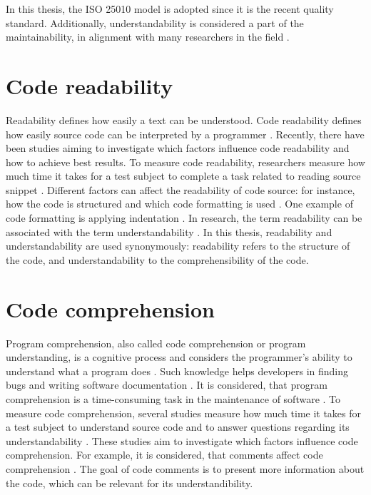 In this thesis, the ISO 25010 model is adopted since it is the recent quality standard. Additionally, understandability is considered a part of the maintainability, in alignment with many researchers in the field \cite{xia2017measuring}. 



\section{Code readability}

Readability defines how easily a text can be understood. Code readability defines how easily source code can be interpreted by a programmer \cite{bakhuizen2019comments}.  Recently, there have been studies aiming to investigate which factors influence code readability and how to achieve best results. 
To measure code readability, researchers measure how much time it takes for a test subject to complete a task related to reading source snippet  \cite{bakhuizen2019comments}.   Different factors can affect the readability of code source: for instance, how the code is structured and which code formatting is used  \cite{bakhuizen2019comments}.  One example of code formatting is applying indentation \cite{buse2009learning}. In research, the term readability can be associated with the term understandability \cite{winkler2024investigating}. In this thesis, readability and understandability are used synonymously: readability refers to the structure of the code, and understandability to the comprehensibility of the code.


\section{Code comprehension}

Program comprehension, also called code comprehension or program understanding, is a cognitive process and considers the programmer's ability to understand what a program does \cite{karahasanovic2007comprehension}. Such knowledge helps developers in finding bugs and writing software documentation \cite{xia2017measuring}.
It is considered, that program comprehension is a time-consuming task in the maintenance of software \cite{8075175}. To measure code comprehension, several studies measure how much time it takes for a test subject to understand source code and to answer questions regarding its understandability \cite{wagner2021code}. These studies aim to investigate which factors influence code comprehension. For example, it is considered, that comments affect code comprehension \cite{de2011comment}. The goal of code comments is to present more information about the code, which can be relevant for its understandibility.

